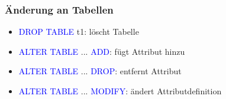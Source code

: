 \documentclass[12pt,a4paper]{article}
\begin{document}
\subsubsection{Änderung an Tabellen}

\begin{itemize}
\item \textcolor{blue}{DROP TABLE} t1: löscht Tabelle
\item \textcolor{blue}{ALTER TABLE} ... \textcolor{blue}{ADD}: fügt Attribut hinzu
\item \textcolor{blue}{ALTER TABLE} ... \textcolor{blue}{DROP}: entfernt Attribut
\item \textcolor{blue}{ALTER TABLE} ... \textcolor{blue}{MODIFY}: ändert Attributdefinition
\end{itemize}
\end{document}
